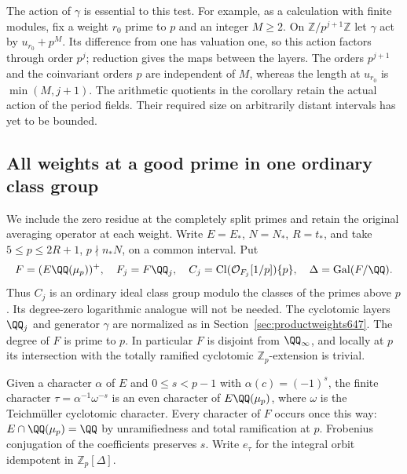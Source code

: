 \documentclass[a4paper,11pt]{article}
\theoremstyle{definition}
\theoremstyle{remark}
\newcommand{\ZZ}{\mathbb Z}\newcommand{\ord}{\operatorname{ord}}
\numberwithin{equation}{section}
\newcommand{\Cl}{\operatorname{Cl}}
\begin{document}
The action of \(\gamma\) is essential to this test. For
example, as a calculation with finite modules, fix a weight
\(r_0\) prime to \(p\) and an integer \(M\ge2\). On
\(\ZZ/p^{j+1}\ZZ\) let \(\gamma\) act by \(u_{r_0}+p^M\).
Its difference from one has valuation one, so this action
factors through order \(p^j\); reduction gives the maps
between the layers. The orders \(p^{j+1}\) and the
coinvariant orders \(p\) are independent of \(M\), whereas
the length at \(u_{r_0}\) is \(\min(M,j+1)\). The arithmetic
quotients in the corollary retain the actual action of the
period fields. Their required size on arbitrarily distant
intervals has yet to be bounded.


\subsection{All weights at a good prime in one ordinary class group}
\label{sec:allgoodmeasure648}

We include the zero residue at the completely split primes
and retain the original averaging operator at each weight.
Write \(E=E_*\), \(N=N_*\), \(R=t_*\), and take
\(5\le p\le2R+1\), \(p\nmid n_*N\), on a common interval.
Put
\[
 F=(E\QQ(\mu_p))^+,\quad F_j=F\QQ_j,\quad
 C_j=\Cl(\mathcal O_{F_j}[1/p])\{p\},\quad
 \Delta=\operatorname{Gal}(F/\QQ).
\]
Thus \(C_j\) is an ordinary ideal class group modulo the
classes of the primes above \(p\). Its degree-zero logarithmic
analogue will not be needed. The cyclotomic layers \(\QQ_j\)
and generator \(\gamma\) are normalized as in
Section~\ref{sec:productweights647}. The degree of \(F\) is
prime to \(p\). In particular \(F\) is disjoint from
\(\QQ_\infty\), and locally at \(p\) its intersection with
the totally ramified cyclotomic \(\ZZ_p\)-extension is trivial.

Given a character \(\alpha\) of \(E\) and \(0\le s<p-1\)
with \(\alpha(c)=(-1)^s\), the finite character
\(\tau=\alpha^{-1}\omega^{-s}\) is an even character of
\(E\QQ(\mu_p)\), where \(\omega\) is the Teichm\"uller
cyclotomic character. Every character of \(F\) occurs once
this way: \(E\cap\QQ(\mu_p)=\QQ\) by unramifiedness and
total ramification at \(p\). Frobenius conjugation of the
coefficients preserves \(s\). Write \(e_\tau\) for the
integral orbit idempotent in \(\ZZ_p[\Delta]\).
\end{document}
